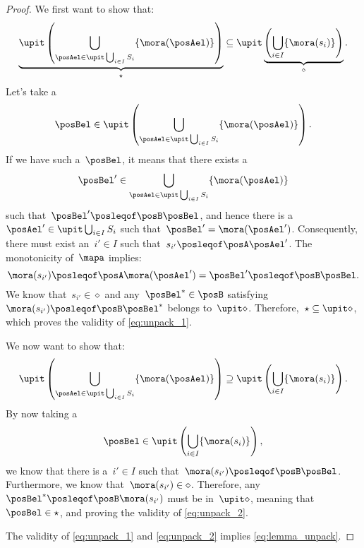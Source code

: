 \begin{proof}
    We first want to show that:
    \begin{equation}
        \label{eq:unpack_1}
        \underbrace{\upit \left(\bigcup_{\posAel \in \upit \bigcup_{i\in I}S_i}\{\mora(\posAel)\} \right)}_{\star}\subseteq \upit \underbrace{\left( \bigcup_{i\in I}\{\mora(s_i)\}\right)}_{\diamond}.
    \end{equation}
    Let's take a
    \begin{equation}
        \posBel \in \upit\left( \bigcup_{\posAel \in \upit \bigcup_{i\in I}S_i}\{\mora(\posAel)\}\right).
    \end{equation}
    If we have such a~$\posBel$, it means that there exists a
    \begin{equation}
        \posBel'\in \bigcup_{\posAel\in \upit\bigcup_{i\in I}S_i}\{\mora(\posAel)\}
    \end{equation}
    such that~$\posBel'\posleqof\posB \posBel$, and hence there is a~$\posAel'\in \upit \bigcup_{i\in I} S_i$ such that~$\posBel'=\mora(\posAel')$.
    Consequently, there must exist an~$i'\in I$ such that~$s_{i'}\posleqof\posA \posAel'$.
    The monotonicity of~$\mapa$ implies:
    \begin{equation}
        \mora(s_{i'})\posleqof\posA \mora(\posAel')=\posBel'\posleqof\posB \posBel.
    \end{equation}
    We know that~$s_{i'}\in \diamond$ and any~$\posBel^*\in \posB$ satisfying~$\mora(s_{i'})\posleqof\posB \posBel^*$ belongs to~$\upit \diamond$.
    Therefore,~$\star\subseteq \upit \diamond$, which proves the validity of \cref{eq:unpack_1}.

    We now want to show that:
    \begin{equation}
        \label{eq:unpack_2}
        \upit \left(\bigcup_{\posAel \in \upit \bigcup_{i\in I}S_i}\{\mora(\posAel)\} \right)\supseteq \upit \left( \bigcup_{i\in I}\{\mora(s_i)\}\right).
    \end{equation}
    By now taking a
    \begin{equation}
        \posBel\in \upit \left( \bigcup_{i\in I}\{\mora(s_i)\}\right),
    \end{equation}
    we know that there is a~$i'\in I$ such that~$\mora(s_{i'})\posleqof\posB \posBel$.
    Furthermore, we know that~$\mora(s_{i'})\in \diamond$.
    Therefore, any~$\posBel^*\posleqof\posB \mora(s_{i'})$ must be in~$\upit \diamond$, meaning that~$\posBel\in \star$, and proving the validity of \cref{eq:unpack_2}.

    The validity of \cref{eq:unpack_1} and \cref{eq:unpack_2} implies \cref{eq:lemma_unpack}.
\end{proof}

